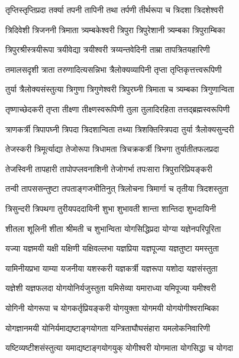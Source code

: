 \twolineshloka
{तृप्तिस्तृप्तिप्रदा तर्क्या तपनी तापिनी तथा}
{तर्पणी तीर्थरूपा च त्रिदशा त्रिदशेश्वरी}%

\twolineshloka
{त्रिदिवेशी त्रिजननी त्रिमाता त्र्यम्बकेश्वरी}
{त्रिपुरा त्रिपुरेशानी त्र्यम्बका त्रिपुराम्बिका}%

\twolineshloka
{त्रिपुरश्रीस्त्रयीरूपा त्रयीवेद्या त्रयीश्वरी}
{त्रय्यन्तवेदिनी ताम्रा तापत्रितयहारिणी}%

\twolineshloka
{तमालसदृशी त्राता तरुणादित्यसन्निभा}
{त्रैलोक्यव्यापिनी तृप्ता तृप्तिकृत्तत्त्वरूपिणी}%

\twolineshloka
{तुर्या त्रैलोक्यसंस्तुत्या त्रिगुणा त्रिगुणेश्वरी}
{त्रिपुरघ्नी त्रिमाता च त्र्यम्बका त्रिगुणान्विता}%

\twolineshloka
{तृष्णाच्छेदकरी तृप्ता तीक्ष्णा तीक्ष्णस्वरूपिणी}
{तुला तुलादिरहिता तत्तद्ब्रह्मस्वरूपिणी}%

\twolineshloka
{त्राणकर्त्री त्रिपापघ्नी त्रिपदा त्रिदशान्विता}
{तथ्या त्रिशक्तिस्त्रिपदा तुर्या त्रैलोक्यसुन्दरी}%

\twolineshloka
{तेजस्करी त्रिमूर्त्याद्या तेजोरूपा त्रिधामता}
{त्रिचक्रकर्त्री त्रिभगा तुर्यातीतफलप्रदा}%

\twolineshloka
{तेजस्विनी तापहारी तापोपप्लवनाशिनी}
{तेजोगर्भा तपःसारा त्रिपुरारिप्रियङ्करी}%

\twolineshloka
{तन्वी तापससन्तुष्टा तपताङ्गजभीतिनुत्}
{त्रिलोचना त्रिमार्गा च तृतीया त्रिदशस्तुता}%

\twolineshloka
{त्रिसुन्दरी त्रिपथगा तुरीयपददायिनी}
{शुभा शुभावती शान्ता शान्तिदा शुभदायिनी}%

\twolineshloka
{शीतला शूलिनी शीता श्रीमती च शुभान्विता}
{योगसिद्धिप्रदा योग्या यज्ञेनपरिपूरिता}%

\twolineshloka
{यज्या यज्ञमयी यक्षी यक्षिणी यक्षिवल्लभा}
{यज्ञप्रिया यज्ञपूज्या यज्ञतुष्टा यमस्तुता}%

\twolineshloka
{यामिनीयप्रभा याम्या यजनीया यशस्करी}
{यज्ञकर्त्री यज्ञरूपा यशोदा यज्ञसंस्तुता}%

\twolineshloka
{यज्ञेशी यज्ञफलदा योगयोनिर्यजुस्तुता}
{यमिसेव्या यमाराध्या यमिपूज्या यमीश्वरी}%

\twolineshloka
{योगिनी योगरूपा च योगकर्तृप्रियङ्करी}
{योगयुक्ता योगमयी योगयोगीश्वराम्बिका}%

\twolineshloka
{योगज्ञानमयी योनिर्यमाद्यष्टाङ्गयोगता}
{यन्त्रिताघौघसंहारा यमलोकनिवारिणी}%

\twolineshloka
{यष्टिव्यष्टीशसंस्तुत्या यमाद्यष्टाङ्गयोगयुक्}
{योगीश्वरी योगमाता योगसिद्धा च योगदा}%

